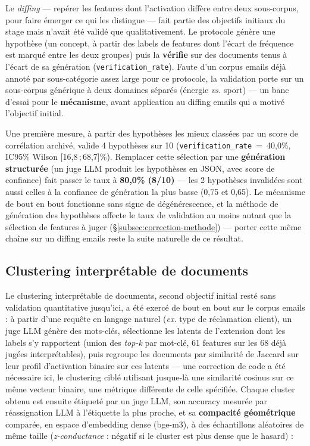 \documentclass[11pt]{article}
\begin{document}
Le \emph{diffing} --- repérer les features dont l'activation diffère entre
deux sous-corpus, pour faire émerger ce qui les distingue --- fait partie des
objectifs initiaux du stage mais n'avait été validé que qualitativement.
Le protocole génère une hypothèse (un concept, à partir des labels de
features dont l'écart de fréquence est marqué entre les deux groupes) puis la
\textbf{vérifie} sur des documents tenus à l'écart de sa génération
(\texttt{verification\_rate}). Faute d'un corpus emails déjà annoté par
sous-catégorie assez large pour ce protocole, la validation porte sur un
sous-corpus générique à deux domaines séparés (énergie \emph{vs.} sport) ---
un banc d'essai pour le \textbf{mécanisme}, avant application au diffing
emails qui a motivé l'objectif initial.

Une première mesure, à partir des hypothèses les mieux classées par un score
de corrélation archivé, valide 4 hypothèses sur 10
(\texttt{verification\_rate}~=~40,0\%, IC95\% Wilson [16,8\,;\,68,7]\%).
Remplacer cette sélection par une \textbf{génération structurée} (un juge LLM
produit les hypothèses en JSON, avec score de confiance) fait passer le taux
à \textbf{80,0\% (8/10)} --- les 2 hypothèses invalidées sont aussi celles à
la confiance de génération la plus basse (0,75 et 0,65). Le mécanisme de bout
en bout fonctionne sans signe de dégénérescence, et la méthode de génération
des hypothèses affecte le taux de validation au moins autant que la sélection
de features à juger (\S\ref{subsec:correction-methode}) --- porter cette
même chaîne sur un diffing emails reste la suite naturelle de ce résultat.

\subsection{Clustering interprétable de documents}

\label{subsec:clustering}

Le clustering interprétable de documents, second objectif initial resté sans
validation quantitative jusqu'ici, a été exercé de bout en bout sur le
corpus emails : à partir d'une requête en langage naturel (\emph{ex.}
\og{}type de réclamation client\fg{}), un juge LLM génère des mots-clés,
sélectionne les latents de l'extension dont les labels s'y rapportent (union
des \emph{top-k} par mot-clé, 61 features sur les 68 déjà jugées
interprétables), puis regroupe les documents par similarité de Jaccard sur
leur profil d'activation binaire sur ces latents --- une correction de code
a été nécessaire ici, le clustering ciblé utilisant jusque-là une similarité
cosinus sur ce même vecteur binaire, une métrique différente de celle
spécifiée. Chaque cluster obtenu est ensuite étiqueté par un juge LLM, son
accuracy mesurée par réassignation LLM à l'étiquette la plus proche, et sa
\textbf{compacité géométrique} comparée, en espace d'embedding dense
(bge-m3), à des échantillons aléatoires de même taille (\emph{z-conductance} :
négatif si le cluster est plus dense que le hasard) :
\end{document}
